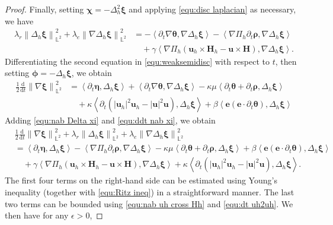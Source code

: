 \documentclass[11pt, reqno]{amsart}
\theoremstyle{definition}
\theoremstyle{remark}
\numberwithin{equation}{section}
\newcommand{\bff}{\boldsymbol}
\newcommand{\bb}{\mathbb}
\newcommand{\ddt}{\frac{\mathrm{d}}{\mathrm{d}t}}
\newcommand{\norm}[2]{\left\|{#1}\right\|_{#2}}
\newcommand{\inpro}[2]{\left\langle#1,#2\right\rangle}
\newcommand{\abs}[1]{\left|{#1}\right|}
\begin{document}
\begin{proof}
Finally, setting $\bff{\chi}=-\Delta_h^2 \bff{\xi}$ and applying \eqref{equ:disc laplacian} as necessary, we have
\begin{align}\label{equ:nab Delta xi}
	\nonumber
	\lambda_r \norm{\Delta_h \bff{\xi}}{\bb{L}^2}^2
	+
	\lambda_e \norm{\nabla \Delta_h \bff{\xi}}{\bb{L}^2}^2
	&=
	-\inpro{\partial_t \nabla \bff{\theta}}{\nabla \Delta_h \bff{\xi}}
	-
	\inpro{\nabla \Pi_h \partial_t \bff{\rho}}{\nabla \Delta_h \bff{\xi}}
	\\
	&\quad
	+
	\gamma \inpro{\nabla \Pi_h(\bff{u}_h\times \bff{H}_h - \bff{u}\times \bff{H})}{\nabla \Delta_h \bff{\xi}}.
\end{align}
Differentiating the second equation in \eqref{equ:weaksemidisc} with respect to $t$, then setting $\bff{\phi}=-\Delta_h \bff{\xi}$, we obtain
\begin{align}\label{equ:ddt nab xi}
	\nonumber
	\frac{1}{2}\ddt \norm{\nabla \bff{\xi}}{\bb{L}^2}^2
	&=
	\inpro{\partial_t \bff{\eta}}{\Delta_h \bff{\xi}}
	+
	\inpro{\partial_t \nabla \bff{\theta}}{\nabla \Delta_h \bff{\xi}}
	-
	\kappa \mu\inpro{\partial_t \bff{\theta}+\partial_t \bff{\rho}}{\Delta_h \bff{\xi}}
	\\
	&\quad
	+
	\kappa \inpro{\partial_t \left(\abs{\bff{u}_h}^2 \bff{u}_h - \abs{\bff{u}}^2 \bff{u}\right)}{\Delta_h \bff{\xi}}
	+
	\beta \inpro{\bff{e}(\bff{e}\cdot \partial_t \bff{\theta})}{\Delta_h \bff{\xi}}
\end{align}
Adding \eqref{equ:nab Delta xi} and \eqref{equ:ddt nab xi}, we obtain
\begin{align*}
	&\frac{1}{2}\ddt \norm{\nabla \bff{\xi}}{\bb{L}^2}^2
	+
	\lambda_r \norm{\Delta_h \bff{\xi}}{\bb{L}^2}^2
	+
	\lambda_e \norm{\nabla \Delta_h \bff{\xi}}{\bb{L}^2}^2
	\\
	&=
	\inpro{\partial_t \bff{\eta}}{\Delta_h \bff{\xi}}
	-
	\inpro{\nabla \Pi_h \partial_t \bff{\rho}}{\nabla \Delta_h \bff{\xi}}
	-
	\kappa \mu\inpro{\partial_t \bff{\theta}+\partial_t \bff{\rho}}{\Delta_h \bff{\xi}}
	+
	\beta \inpro{\bff{e}(\bff{e}\cdot \partial_t \bff{\theta})}{\Delta_h \bff{\xi}}
	\\
	&\quad
	+
	\gamma \inpro{\nabla \Pi_h(\bff{u}_h\times \bff{H}_h - \bff{u}\times \bff{H})}{\nabla \Delta_h \bff{\xi}}
	+
	\kappa \inpro{\partial_t \left(\abs{\bff{u}_h}^2 \bff{u}_h - \abs{\bff{u}}^2 \bff{u}\right)}{\Delta_h \bff{\xi}}.
\end{align*}
The first four terms on the right-hand side can be estimated using Young's inequality (together with \eqref{equ:Ritz ineq}) in a straightforward manner. The last two terms can be bounded using \eqref{equ:nab uh cross Hh} and \eqref{equ:dt uh2uh}. We then have for any $\epsilon>0$,

\end{proof}
\end{document}
